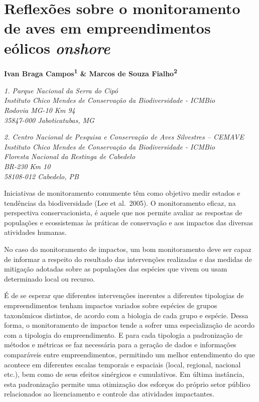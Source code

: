 \documentclass[
  oneside]{scrbook}
\begin{document}
\hypertarget{cap6}{%
\chapter{\texorpdfstring{Reflexões sobre o monitoramento de aves em empreendimentos eólicos \emph{onshore}}{Reflexões sobre o monitoramento de aves em empreendimentos eólicos onshore}}\label{cap6}}

\pagestyle{headings}

\textbf{Ivan Braga Campos\textsuperscript{1} \& Marcos de Souza Fialho\textsuperscript{2}}

\emph{1. Parque Nacional da Serra do Cipó}\\
\emph{Instituto Chico Mendes de Conservação da Biodiversidade - ICMBio}\\
\emph{Rodovia MG-10 Km 94}\\
\emph{35847-000 Jaboticatubas, MG}

\emph{2. Centro Nacional de Pesquisa e Conservação de Aves Silvestres -- CEMAVE}\\
\emph{Instituto Chico Mendes de Conservação da Biodiversidade - ICMBio}\\
\emph{Floresta Nacional da Restinga de Cabedelo}\\
\emph{BR-230 Km 10}\\
\emph{58108-012 Cabedelo, PB}

Iniciativas de monitoramento comumente têm como objetivo medir estados e tendências da biodiversidade (Lee et al.~2005). O monitoramento eficaz, na perspectiva conservacionista, é aquele que nos permite avaliar as respostas de populações e ecossistemas às práticas de conservação e aos impactos das diversas atividades humanas.

No caso do monitoramento de impactos, um bom monitoramento deve ser capaz de informar a respeito do resultado das intervenções realizadas e das medidas de mitigação adotadas sobre as populações das espécies que vivem ou usam determinado local ou recurso.

É de se esperar que diferentes intervenções inerentes a diferentes tipologias de empreendimentos tenham impactos variados sobre espécies de grupos taxonômicos distintos, de acordo com a biologia de cada grupo e espécie. Dessa forma, o monitoramento de impactos tende a sofrer uma especialização de acordo com a tipologia do empreendimento. E para cada tipologia a padronização de métodos e métricas se faz necessária para a geração de dados e informações comparáveis entre empreendimentos, permitindo um melhor entendimento do que acontece em diferentes escalas temporais e espaciais (local, regional, nacional etc.), bem como de seus efeitos sinérgicos e cumulativos. Em última instância, esta padronização permite uma otimização dos esforços do próprio setor público relacionados ao licenciamento e controle das atividades impactantes.
\end{document}
